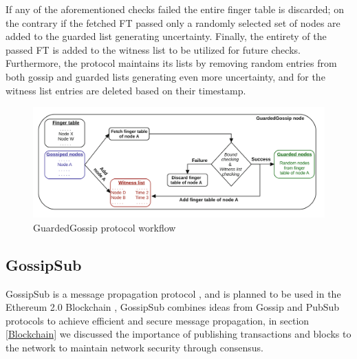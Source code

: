 \documentclass[12pt,twocolumn]{article}
\begin{document}
If any of the aforementioned checks failed the entire finger table is discarded; on the contrary if the fetched FT passed only a randomly
selected set of nodes are added to the guarded list generating uncertainty. Finally, the entirety of the passed FT is added
to the witness list to be utilized for future checks. Furthermore, the protocol maintains its lists by removing random entries
from both gossip and guarded lists generating even more uncertainty, and for the witness list entries are deleted based on their timestamp.

\begin{figure}
    \includegraphics[width=\linewidth]{fig/guardedgossip.png}
    \caption{GuardedGossip protocol workflow \cite{guarded_gossip}}
\end{figure}

\subsection{GossipSub}
GossipSub is a message propagation protocol \cite{gossip_sub}, and is planned to be used in the Ethereum 2.0 Blockchain \cite{eth:network},
GossipSub combines ideas from Gossip and PubSub protocols to achieve efficient and secure message propagation, in section \ref{Blockchain} we discussed
the importance of publishing transactions and blocks to the network to maintain network security through consensus.
\end{document}
